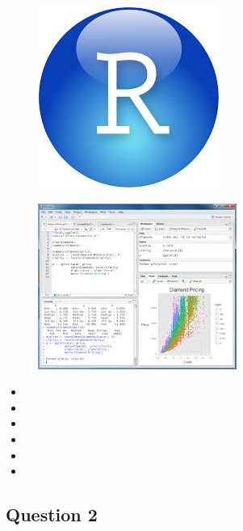 \documentclass[12pt]{article}
\begin{document}
\begin{figure}
\centering
\includegraphics[width=0.7\linewidth]{rstudio}

\end{figure}
\begin{figure}
\centering
\includegraphics[width=0.7\linewidth]{rstudio2}

\end{figure}

\begin{itemize}
\item
\item
\item
\item
\item
\item 
\end{itemize}


\newpage
\subsection*{Question 2}
\end{document}
